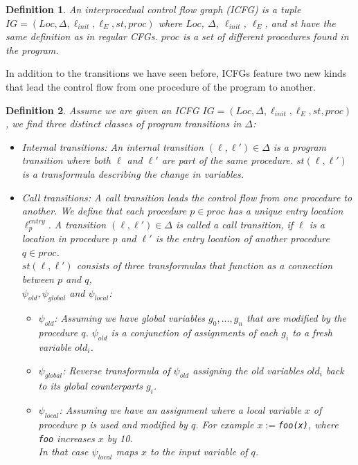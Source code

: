 \documentclass{article}
\newtheorem{mydef}{Definition}
\begin{document}
	\begin{mydef}
		An interprocedual control flow graph (ICFG) is a tuple \\$IG = (Loc, \Delta, \ell_{init}, \ell_E, st, proc)$ where $Loc$, $\Delta$, $\ell_{init}$, $\ell_E$, and st have the same definition as in regular CFGs. $proc$ is a set of different procedures found in the program. 
	\end{mydef}
	In addition to the transitions we have seen before, ICFGs feature two new kinds that lead the control flow from one procedure of the program to another.
	\begin{mydef} Assume we are given an ICFG $IG = (Loc, \Delta, \ell_{init}, \ell_E, st, proc)$, we find three distinct classes of program transitions in $\Delta$:
		\begin{itemize}
			\item Internal transitions: An internal transition $(\ell, \ell') \in \Delta$ is a program transition where both $\ell$ and $\ell'$ are part of the same procedure. $st(\ell, \ell')$ is a transformula describing the change in variables.
			
			\item Call transitions:  A call transition leads the control flow from one procedure to another. We define that each procedure $p \in proc$ has a unique entry location $\ell^{entry}_p$. A transition $(\ell, \ell') \in \Delta$ is called a call transition, if $\ell$ is a location in procedure $p$ and $\ell'$ is the entry location of another procedure $q \in proc$. \\ $st(\ell, \ell')$ consists of three transformulas that function as a connection between $p$ and $q$, \\ $\psi_{old}, \psi_{global}$ and $\psi_{local}$: 
			\begin{itemize}
				\item$\psi_{old}$: Assuming we have global variables $g_0, ..., g_n$ that are modified by the procedure $q$. $\psi_{old}$ is a conjunction of assignments of each $g_i$ to a fresh variable $old_{i}$. 
				\item $\psi_{global}$: Reverse transformula of $\psi_{old}$ assigning the old variables $old_i$ back to its global counterparts $g_i$.
				\item $\psi_{local}$: Assuming we have an assignment where a local variable $x$ of procedure $p$ is used and modified by $q$. For example $x := $\texttt{foo(x)}, where \texttt{foo} increases $x$ by 10. \\
				In that case $\psi_{local}$ maps $x$ to the input variable of $q$.
			\end{itemize} 
			

\end{itemize}
\end{mydef}
\end{document}
